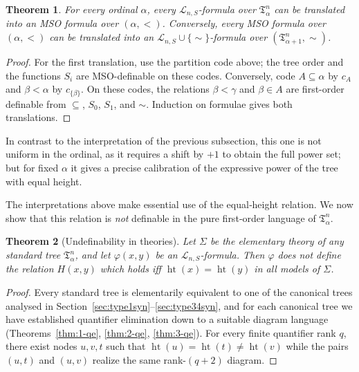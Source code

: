 \documentclass{amsart}
\newtheorem{theorem}{Theorem}
\theoremstyle{definition}
\begin{document}
\begin{theorem}
    For every ordinal $\alpha$, every $\mathcal L_{n,S}$-formula over $\mathfrak T_\alpha^n$ can be translated into an MSO formula over $(\alpha,<)$. Conversely, every MSO formula over $(\alpha,<)$ can be translated into an $\mathcal L_{n,S}\cup\{\sim\}$-formula over $(\mathfrak T_{\alpha+1}^n,\sim)$.
\end{theorem}
\begin{proof}
    For the first translation, use the partition code above; the tree order and the functions $S_i$ are MSO-definable on these codes. Conversely, code $A\subseteq\alpha$ by $c_A$ and $\beta<\alpha$ by $c_{\{\beta\}}$. On these codes, the relations $\beta<\gamma$ and $\beta\in A$ are first-order definable from $\subseteq$, $S_0$, $S_1$, and $\sim$. Induction on formulae gives both translations.
\end{proof}

 In contrast to the interpretation of the previous subsection, this one is not uniform in the ordinal, as it requires a shift by $+1$ to obtain the full power set; but for fixed $\alpha$ it gives a precise calibration of the expressive power of the tree with equal height.



The interpretations above make essential use of the equal‑height relation. We now show that this relation is \emph{not} definable in the pure first‑order language of $\mathfrak{T}_\alpha^n$.

\begin{theorem}[Undefinability in theories]\label{thm:height-not-definable-theory}
    Let $\Sigma$ be the elementary theory of any standard tree $\mathfrak{T}_\alpha^n$, and let $\varphi(x,y)$ be an $\mathcal{L}_{n,S}$-formula.  Then $\varphi$ does not define the relation $H(x,y)$ which holds iff $\operatorname{ht}(x)=\operatorname{ht}(y)$ in all models of $\Sigma$.
\end{theorem}
\begin{proof}
  Every standard tree is elementarily equivalent to one of the canonical trees analysed in Section~\ref{sec:type1syn}--\ref{sec:type34syn}, and for each canonical tree we have established quantifier elimination down to a suitable diagram language (Theorems~\ref{thm:1-qe}, \ref{thm:2-qe}, \ref{thm:3-qe}).
  For every finite quantifier rank $q$, there exist nodes $u,v,t$ such that $\operatorname{ht}(u)=\operatorname{ht}(t)\neq\operatorname{ht}(v)$ while the pairs $(u,t)$ and $(u,v)$ realize the same rank-$(q+2)$ diagram.

\end{proof}
\end{document}
